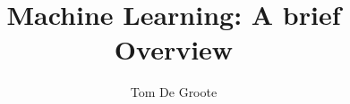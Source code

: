 \documentclass[openany]{book}
\author{Tom De Groote}
\title{Machine Learning: A brief Overview}
\begin{document}
\maketitle
\tableofcontents










\begin{appendices}

\end{appendices}
\end{document}
